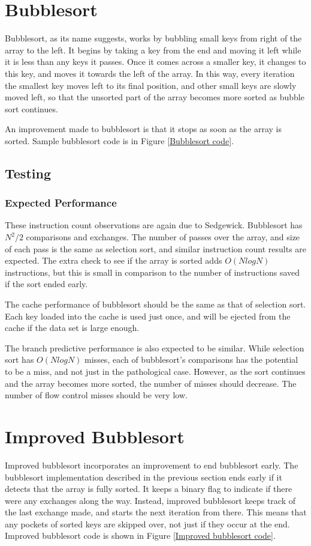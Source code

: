 \section{Bubblesort}
Bubblesort, as its name suggests, works by bubbling small keys from right of
the array to the left. It begins by taking a key from the end and moving it left
while it is less than any keys it passes. Once it comes across a smaller key, it
changes to this key, and moves it towards the left of the array. In this way, every
iteration the smallest key moves left to its final position, and other small
keys are slowly moved left, so that the unsorted part of the array becomes more
sorted as bubble sort continues.

An improvement made to bubblesort is that it stops as soon as the array is
sorted. Sample bubblesort code is in Figure \vref{Bubblesort code}.

\subsection{Testing}
\subsubsection{Expected Performance}
These instruction count observations are again due to Sedgewick.  Bubblesort has
$N^2/2$ comparisons and exchanges. The number of passes over the array, and size
of each pass is the same as selection sort, and similar instruction count
results are expected.  The extra check to see if the array is sorted adds
$O(NlogN)$ instructions, but this is small in comparison to the number of
instructions saved if the sort ended early.

The cache performance of bubblesort should be the same as that of selection
sort. Each key loaded into the cache is used just once, and will be ejected from
the cache if the data set is large enough.

The branch predictive performance is also expected to be similar. While
selection sort has $O(NlogN)$ misses, each of bubblesort's comparisons has
the potential to be a miss, and not just in the pathological case. However, as
the sort continues and the array becomes more sorted, the number of misses
should decrease. The number of flow control misses should be very low.

\section{Improved Bubblesort}
Improved bubblesort incorporates an improvement to end bubblesort early. The
bubblesort implementation described in the previous section ends early if it
detects that the array is fully sorted.  It keeps a binary flag to indicate if
there were any exchanges along the way.  Instead, improved bubblesort keeps
track of the last exchange made, and starts the next iteration from there. This
means that any pockets of sorted keys are skipped over, not just if they occur
at the end. Improved bubblesort code is shown in Figure \vref{Improved bubblesort code}.

